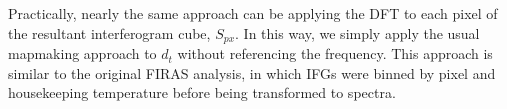 \documentclass{aa}
\begin{document}
Practically, nearly the same approach can be applying the DFT to each pixel of the resultant interferogram cube, $S_{px}$. In this way, we simply apply the usual mapmaking approach to $d_t$ without referencing the frequency. This approach is similar to the original FIRAS analysis, in which IFGs were binned by pixel and housekeeping temperature before being transformed to spectra.


%



\end{document}
